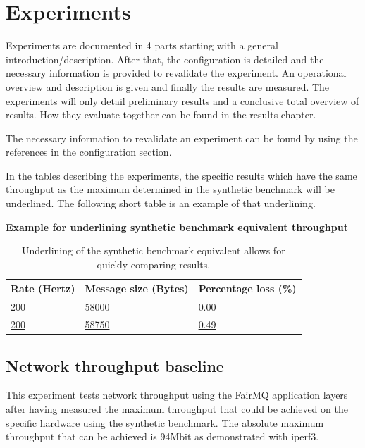 \documentclass[]{article}
\begin{document}
\section{Experiments}
Experiments are documented in 4 parts starting with a general introduction/description. After that, the configuration is detailed and the necessary information is provided to revalidate the experiment. An operational overview and description is given and finally the results are measured. The experiments will only detail preliminary results and a conclusive total overview of results. How they evaluate together can be found in the results chapter. 

The necessary information to revalidate an experiment can be found by using the references in the configuration section.

In the tables describing the experiments, the specific results which have the same throughput as the maximum determined in the synthetic benchmark will be underlined. The following short table is an example of that underlining.

\begin{table}[H]
	\textbf{Example for underlining synthetic benchmark equivalent throughput}
	\begin{center}
		\begin{tabular}{ | l | l | l | }
			\hline
			\textbf{Rate (Hertz)} & \textbf{Message size (Bytes)} & \textbf{Percentage loss (\%)} \\ \hline
			
			200 & 58000 & 0.00 \\ \hline
			\underline{200} & \underline{58750} & \underline{0.49} \\ \hline
		\end{tabular}
		\caption{Underlining of the synthetic benchmark equivalent allows for quickly comparing results.}
		\label{tab:benchmark}
	\end{center}
\end{table}

\subsection{Network throughput baseline}
This experiment tests network throughput using the FairMQ application layers after having measured the maximum throughput that could be achieved on the specific hardware using the synthetic benchmark. The absolute maximum throughput that can be achieved is 94Mbit as demonstrated with iperf3.
\end{document}
